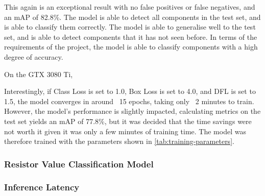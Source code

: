 This again is an exceptional result with no false positives or false negatives, and an mAP of 82.8\%. The model is able to detect all components in the test set, and is able to classify them correctly. The model is able to generalise well to the test set, and is able to detect components that it has not seen before. In terms of the requirements of the project, the model is able to classify components with a high degree of accuracy.

  
  
On the GTX 3080 Ti, 
  
Interestingly, if Class Loss is set to 1.0, Box Loss is set to 4.0, and DFL is set to 1.5, the model converges in around ~15 epochs, taking only ~2 minutes to train. However, the model's performance is slightly impacted, calculating metrics on the test set yields an mAP of 77.8\%, but it was decided that the time savings were not worth it given it was only a few minutes of training time. The model was therefore trained with the parameters shown in \autoref{tab:training-parameters}.


\subsubsection{Resistor Value Classification Model}


\subsubsection{Inference Latency}
